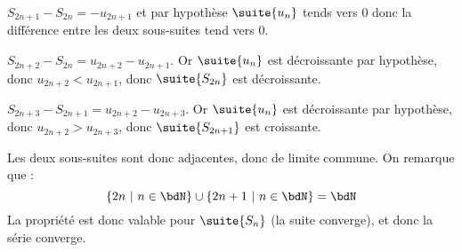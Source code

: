 \documentclass[a4paper,french,bookmarks]{article}
\begin{document}
\begin{enumerate}
\begin{nproof}
        \begin{enumerate}
            \itt $S_{2n+1} - S_{2n} = -u_{2n+1}$ et par hypothèse $\suite{u_n}$ tends vers $0$ donc la différence entre les deux sous-suites tend vers $0$.
            
            \itt $S_{2n+2} - S_{2n} = u_{2n+2} - u_{2n+1}$. Or $\suite{u_n}$ est décroissante par hypothèse, donc $u_{2n+2} < u_{2n+1}$, donc $\suite{S_{2n}}$ est décroissante.
            
            \itt $S_{2n+3} - S_{2n+1} = u_{2n+2} -u_{2n+3}$. Or $\suite{u_n}$ est décroissante par hypothèse, donc $u_{2n+2} > u_{2n+3}$, donc $\suite{S_{2n+1}}$ est croissante.
        \end{enumerate}
        
        Les deux sous-suites sont donc adjacentes, donc de limite commune. On remarque que :
        \[ \left\{ 2n \ \middle\vert  \ n \in \bdN \right\} \cup \left\{ 2n +1 \ \middle\vert  \ n \in \bdN \right\} = \bdN\]
        La propriété est donc valable pour $\suite{S_n}$ (la suite converge), et donc la série converge.
    \end{nproof}
        

\end{enumerate}
\end{document}
